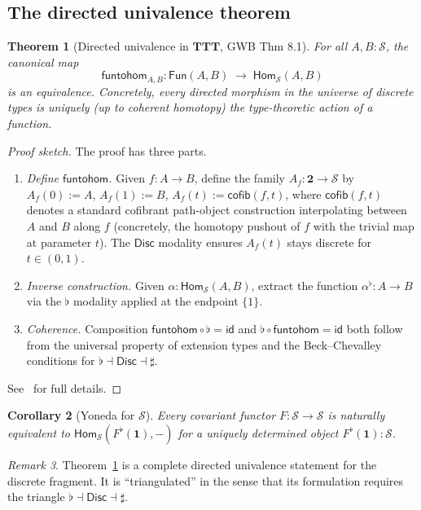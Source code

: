 \documentclass[12pt]{article}
\newtheorem{theorem}{Theorem}[section]
\newtheorem{corollary}[theorem]{Corollary}
\theoremstyle{definition}
\theoremstyle{remark}
\newtheorem{remark}[theorem]{Remark}
\newcommand{\Hom}{\mathsf{Hom}}
\newcommand{\Fun}{\mathsf{Fun}}
\newcommand{\id}{\mathsf{id}}
\newcommand{\funtohom}{\mathsf{funtohom}}
\newcommand{\Disc}{\mathsf{Disc}}
\newcommand{\TTT}{\mathbf{TTT}}
\newcommand{\twoI}{\mathbf{2}}
\begin{document}
\subsection{The directed univalence theorem}

\begin{theorem}[Directed univalence in $\TTT$, GWB Thm 8.1]\label{thm:dua-s}
For all $A, B : \mathcal{S}$, the canonical map
\[
\funtohom_{A,B} : \Fun(A,B) \;\longrightarrow\; \Hom_{\mathcal{S}}(A,B)
\]
is an equivalence. Concretely, every directed morphism in the universe of discrete types is uniquely (up to coherent homotopy) the type-theoretic action of a function.
\end{theorem}

\begin{proof}[Proof sketch]
The proof has three parts.
\begin{enumerate}
\item \emph{Define $\funtohom$.} Given $f : A \to B$, define the family $A_f : \twoI \to \mathcal{S}$ by $A_f(0) := A$, $A_f(1) := B$, $A_f(t) := \mathsf{cofib}(f, t)$, where $\mathsf{cofib}(f, t)$ denotes a standard cofibrant path-object construction interpolating between $A$ and $B$ along $f$ (concretely, the homotopy pushout of $f$ with the trivial map at parameter $t$). The $\Disc$ modality ensures $A_f(t)$ stays discrete for $t \in (0,1)$.
\item \emph{Inverse construction.} Given $\alpha : \Hom_{\mathcal{S}}(A,B)$, extract the function $\alpha^\flat : A \to B$ via the $\flat$ modality applied at the endpoint $\{1\}$.
\item \emph{Coherence.} Composition $\funtohom \circ \flat = \id$ and $\flat \circ \funtohom = \id$ both follow from the universal property of extension types and the Beck--Chevalley conditions for $\flat \dashv \Disc \dashv \sharp$.
\end{enumerate}
See~\cite[\S 8]{GWB2024} for full details.
\end{proof}

\begin{corollary}[Yoneda for $\mathcal{S}$]\label{cor:yoneda-s}
Every covariant functor $F : \mathcal{S} \to \mathcal{S}$ is naturally equivalent to $\Hom_{\mathcal{S}}(F^\flat(\mathbf{1}), -)$ for a uniquely determined object $F^\flat(\mathbf{1}) : \mathcal{S}$.
\end{corollary}

\begin{remark}
Theorem~\ref{thm:dua-s} is a complete directed univalence statement for the discrete fragment. It is ``triangulated'' in the sense that its formulation requires the triangle $\flat \dashv \Disc \dashv \sharp$.
\end{remark}
\end{document}
